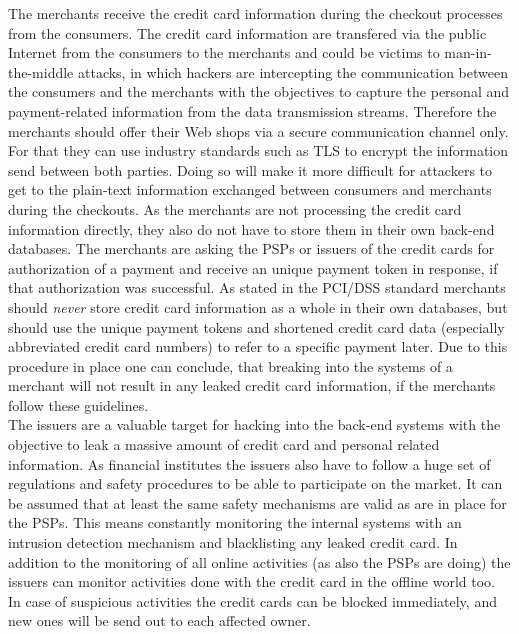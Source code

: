 The merchants receive the credit card information during the checkout processes from the consumers. The credit card information are transfered via the public Internet from the consumers to the merchants and could be victims to man-in-the-middle attacks, in which hackers are intercepting the communication between the consumers and the merchants with the objectives to capture the personal and payment-related information from the data transmission streams. Therefore the merchants should offer their Web shops via a secure communication channel only. For that they can use industry standards such as \gls{TLS} to encrypt the information send between both parties. Doing so will make it more difficult for attackers to get to the plain-text information exchanged between consumers and merchants during the checkouts. As the merchants are not processing the credit card information directly, they also do not have to store them in their own back-end databases. The merchants are asking the \gls{PSP}s or issuers of the credit cards for authorization of a payment and receive an unique payment token in response, if that authorization was successful. As stated in the \gls{PCI/DSS} standard \citep{virtue2009payment} merchants should \emph{never} store credit card information as a whole in their own databases, but should use the unique payment tokens and shortened credit card data (especially abbreviated credit card numbers) to refer to a specific payment later. Due to this procedure in place one can conclude, that breaking into the systems of a merchant will not result in any leaked credit card information, if the merchants follow these guidelines. \\

The issuers are a valuable target for hacking into the back-end systems with the objective to leak a massive amount of credit card and personal related information. As financial institutes the issuers also have to follow a huge set of regulations and safety procedures to be able to participate on the market. It can be assumed that at least the same safety mechanisms are valid as are in place for the \gls{PSP}s. This means constantly monitoring the internal systems with an intrusion detection mechanism and blacklisting any leaked credit card. In addition to the monitoring of all online activities (as also the \gls{PSP}s are doing) the issuers can monitor activities done with the credit card in the offline world too. In case of suspicious activities the credit cards can be blocked immediately, and new ones will be send out to each affected owner. \\

